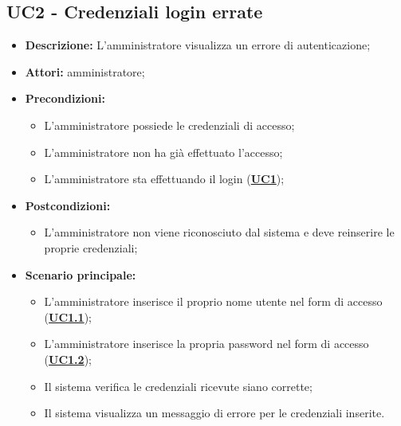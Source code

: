 \documentclass[5pt]{article}
\begin{document}
\subsection{UC2 - Credenziali login errate}
\label{sec:UC2}
\begin{itemize}
	\item \textbf{Descrizione:} L’amministratore visualizza un errore di autenticazione;
	\item \textbf{Attori:} amministratore;
	\item \textbf{Precondizioni:} 
	\begin{itemize}
		\item L’amministratore possiede le credenziali di accesso;
		\item L’amministratore non ha già effettuato l’accesso;
		\item L’amministratore sta effettuando il login (\hyperref[sec:UC1]{\textbf{UC1}});
	\end{itemize}
	\item \textbf{Postcondizioni:}
	\begin{itemize}
		\item L’amministratore non viene riconosciuto dal sistema e deve reinserire le proprie credenziali;
	\end{itemize}
	\item \textbf{Scenario principale:} 
	\begin{itemize}
		\item L’amministratore inserisce il proprio nome utente nel form di accesso (\hyperref[sec:UC1.1]{\textbf{UC1.1}});
		\item L’amministratore inserisce la propria password nel form di accesso (\hyperref[sec:UC1.2]{\textbf{UC1.2}});
		\item Il sistema verifica le credenziali ricevute siano corrette;
		\item Il sistema visualizza un messaggio di errore per le credenziali inserite.
	\end{itemize}
\end{itemize}
\end{document}

